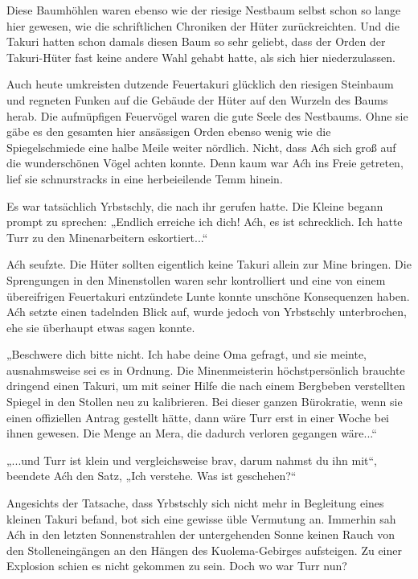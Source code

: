 Diese Baumhöhlen waren ebenso wie der riesige Nestbaum selbst schon so lange hier gewesen, wie die schriftlichen Chroniken der Hüter zurückreichten. Und die Takuri hatten schon damals diesen Baum so sehr geliebt, dass der Orden der Takuri-Hüter fast keine andere Wahl gehabt hatte, als sich hier niederzulassen.

Auch heute umkreisten dutzende Feuertakuri glücklich den riesigen Steinbaum und regneten Funken auf die Gebäude der Hüter auf den Wurzeln des Baums herab. Die aufmüpfigen Feuervögel waren die gute Seele des Nestbaums. Ohne sie gäbe es den gesamten hier ansässigen Orden ebenso wenig wie die Spiegelschmiede eine halbe Meile weiter nördlich. Nicht, dass Aćh sich groß auf die wunderschönen Vögel achten konnte. Denn kaum war Aćh ins Freie getreten, lief sie schnurstracks in eine herbeieilende Temm hinein.

Es war tatsächlich Yrbstschly, die nach ihr gerufen hatte. Die Kleine begann prompt zu sprechen: „Endlich erreiche ich dich! Aćh, es ist schrecklich. Ich hatte Turr zu den Minenarbeitern eskortiert...“

Aćh seufzte. Die Hüter sollten eigentlich keine Takuri allein zur Mine bringen. Die Sprengungen in den Minenstollen waren sehr kontrolliert und eine von einem übereifrigen Feuertakuri entzündete Lunte konnte unschöne Konsequenzen haben. Aćh setzte einen tadelnden Blick auf, wurde jedoch von Yrbstschly unterbrochen, ehe sie überhaupt etwas sagen konnte.

„Beschwere dich bitte nicht. Ich habe deine Oma gefragt, und sie meinte, ausnahmsweise sei es in Ordnung. Die Minenmeisterin höchstpersönlich brauchte dringend einen Takuri, um mit seiner Hilfe die nach einem Bergbeben verstellten Spiegel in den Stollen neu zu kalibrieren. Bei dieser ganzen Bürokratie, wenn sie einen offiziellen Antrag gestellt hätte, dann wäre Turr erst in einer Woche bei ihnen gewesen. Die Menge an Mera, die dadurch verloren gegangen wäre...“

„...und Turr ist klein und vergleichsweise brav, darum nahmst du ihn mit“, beendete Aćh den Satz, „Ich verstehe. Was ist geschehen?“

Angesichts der Tatsache, dass Yrbstschly sich nicht mehr in Begleitung eines kleinen Takuri befand, bot sich eine gewisse üble Vermutung an. Immerhin sah Aćh in den letzten Sonnenstrahlen der untergehenden Sonne keinen Rauch von den Stolleneingängen an den Hängen des Kuolema-Gebirges aufsteigen. Zu einer Explosion schien es nicht gekommen zu sein. Doch wo war Turr nun?

